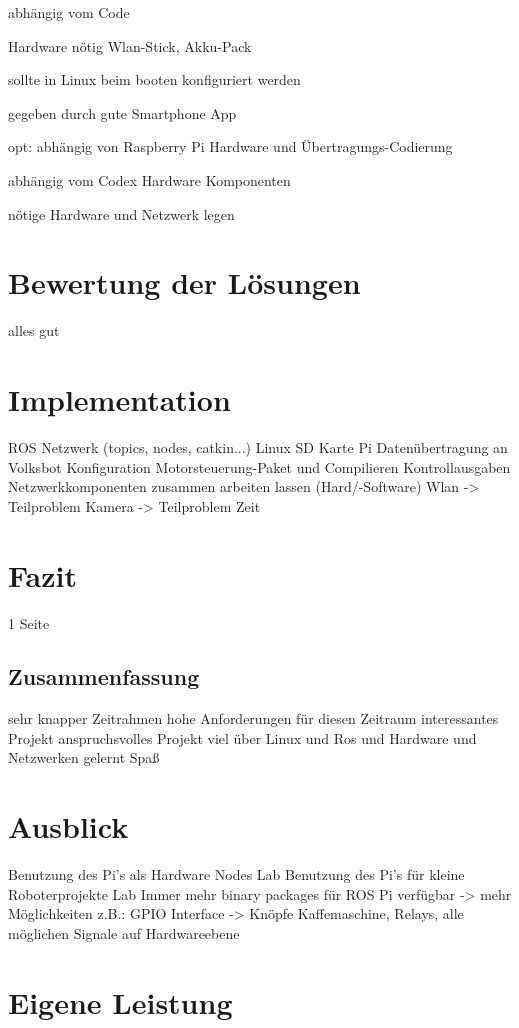 \documentclass[12pt]{article}
\begin{document}
abhängig vom Code

Hardware nötig Wlan-Stick, Akku-Pack 

sollte in Linux beim booten konfiguriert werden

gegeben durch gute Smartphone App

opt:
abhängig von Raspberry Pi Hardware und Übertragungs-Codierung

abhängig vom Codex Hardware Komponenten

nötige Hardware und Netzwerk legen

\section{Bewertung der Lösungen}

alles gut

\section{Implementation}

ROS Netzwerk (topics, nodes, catkin...)
Linux SD Karte Pi
Datenübertragung an Volksbot
Konfiguration Motorsteuerung-Paket und Compilieren
Kontrollausgaben 
Netzwerkkomponenten zusammen arbeiten lassen (Hard/-Software)
Wlan -> Teilproblem
Kamera -> Teilproblem Zeit


\section{Fazit}
1 Seite
\subsection{Zusammenfassung}

sehr knapper Zeitrahmen
hohe Anforderungen für diesen Zeitraum
interessantes Projekt
anspruchsvolles Projekt
viel über Linux und Ros und Hardware und Netzwerken gelernt
Spaß

\section{Ausblick}

Benutzung des Pi's als Hardware Nodes Lab
Benutzung des Pi's für kleine Roboterprojekte Lab
Immer mehr binary packages für ROS Pi verfügbar -> mehr Möglichkeiten
z.B.: GPIO Interface -> Knöpfe Kaffemaschine, Relays, alle möglichen Signale
auf Hardwareebene

\section{Eigene Leistung}
\end{document}
